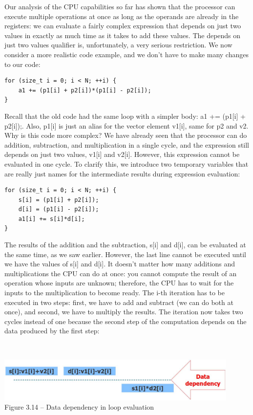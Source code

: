 Our analysis of the CPU capabilities so far has shown that the processor can execute multiple operations at once as long as the operands are already in the registers: we can evaluate a fairly complex expression that depends on just two values in exactly as much time as it takes to add these values. The depends on just two values qualifier is, unfortunately, a very serious restriction. We now consider a more realistic code example, and we don't have to make many changes to our code:

\begin{lstlisting}[style=styleCXX]
for (size_t i = 0; i < N; ++i) {
	a1 += (p1[i] + p2[i])*(p1[i] - p2[i]);
}
\end{lstlisting}

Recall that the old code had the same loop with a simpler body: a1 += (p1[i] + p2[i]);. Also, p1[i] is just an alias for the vector element v1[i], same for p2 and v2. Why is this code more complex? We have already seen that the processor can do addition, subtraction, and multiplication in a single cycle, and the expression still depends on just two values, v1[i] and v2[i]. However, this expression cannot be evaluated in one cycle. To clarify this, we introduce two temporary variables that are really just names for the intermediate results during expression evaluation:

\begin{lstlisting}[style=styleCXX]
for (size_t i = 0; i < N; ++i) {
	s[i] = (p1[i] + p2[i]);
	d[i] = (p1[i] - p2[i]);
	a1[i] += s[i]*d[i];
}
\end{lstlisting}

The results of the addition and the subtraction, s[i] and d[i], can be evaluated at the same time, as we saw earlier. However, the last line cannot be executed until we have the values of s[i] and d[i]. It doesn't matter how many additions and multiplications the CPU can do at once: you cannot compute the result of an operation whose inputs are unknown; therefore, the CPU has to wait for the inputs to the multiplication to become ready. The i-th iteration has to be executed in two steps: first, we have to add and subtract (we can do both at once), and second, we have to multiply the results. The iteration now takes two cycles instead of one because the second step of the computation depends on the data produced by the first step:

\hspace*{\fill} \\ %
\begin{center}
\includegraphics[width=0.9\textwidth]{content/1/chapter3/images/14.jpg}\\
Figure 3.14 – Data dependency in loop evaluation
\end{center}

